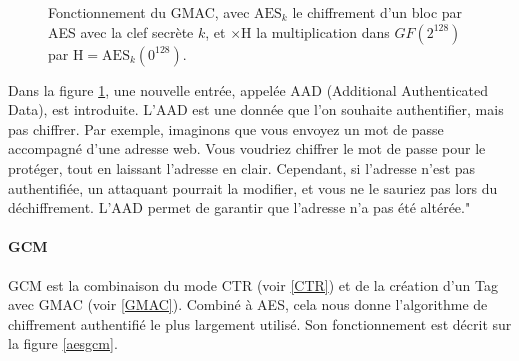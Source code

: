 \documentclass[a4paper, 12pt]{article}
\begin{document}
\begin{figure}[h]
\caption{Fonctionnement du GMAC, avec $\text{AES}_k$ le chiffrement d'un bloc par AES avec la clef secrète $k$, et $\times \text{H}$ la multiplication dans \hyperref[GF]{$GF$}$\left(2^{128}\right)$ par $\text{H} = \text{AES}_k\left({0}^{128}\right)$.}
\label{gmac}
\end{figure}

Dans la figure \ref{gmac}, une nouvelle entrée, appelée AAD (Additional Authenticated Data), est introduite. L'AAD est une donnée que l'on souhaite authentifier, mais pas chiffrer. Par exemple, imaginons que vous envoyez un mot de passe accompagné d'une adresse web. Vous voudriez chiffrer le mot de passe pour le protéger, tout en laissant l'adresse en clair. Cependant, si l'adresse n'est pas authentifiée, un attaquant pourrait la modifier, et vous ne le sauriez pas lors du déchiffrement. L'AAD permet de garantir que l'adresse n'a pas été altérée."

\paragraph{GCM}

GCM est la combinaison du mode CTR (voir \ref{CTR}) et de la création d'un Tag avec GMAC (voir \ref{GMAC}). Combiné à AES, cela nous donne l'algorithme de chiffrement authentifié le plus largement utilisé. Son fonctionnement est décrit sur la figure \ref{aesgcm}.
\end{document}
